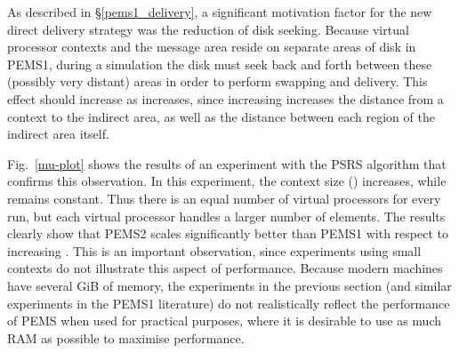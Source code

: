 \documentclass[12pt]{carletoncsthesis}
\begin{document}
As described in \S\ref{pems1_delivery}, a significant motivation factor
for the new direct delivery strategy was the reduction of disk seeking.
Because virtual processor contexts and the message area reside on separate
areas of disk in PEMS1, during a simulation the disk must seek back and forth
between these (possibly very distant) areas in order to perform swapping and
delivery.  This effect should increase as  increases, since increasing
 increases the distance from a context to the indirect area, as well
as the distance between each region of the indirect area itself.

Fig.~\ref{mu-plot} shows the results of an experiment with the PSRS algorithm
that confirms this observation.  In this experiment, the context size ()
increases, while  remains constant.  Thus there is an equal number of
virtual processors for every run, but each virtual processor handles a larger
number of elements.  The results clearly show that PEMS2 scales significantly
better than PEMS1 with respect to increasing .  This is an important
observation, since experiments using small contexts do not illustrate this
aspect of performance.  Because modern machines have several GiB of memory,
the experiments in the previous section (and similar experiments in the PEMS1
literature) do not realistically reflect the performance of PEMS when used
for practical purposes, where it is desirable to use as much RAM as possible
to maximise performance.
\end{document}
